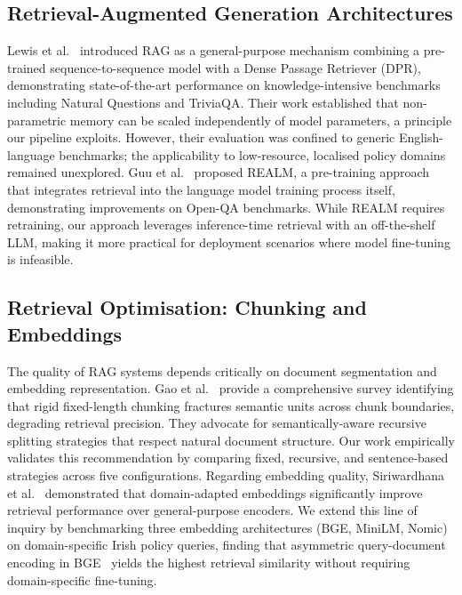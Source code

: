 \documentclass[conference]{IEEEtran}
\begin{document}
\subsection{Retrieval-Augmented Generation Architectures}

Lewis et al.~\cite{lewis2020retrieval} introduced RAG as a general-purpose mechanism combining a pre-trained sequence-to-sequence model with a Dense Passage Retriever (DPR), demonstrating state-of-the-art performance on knowledge-intensive benchmarks including Natural Questions and TriviaQA. Their work established that non-parametric memory can be scaled independently of model parameters, a principle our pipeline exploits. However, their evaluation was confined to generic English-language benchmarks; the applicability to low-resource, localised policy domains remained unexplored. Guu et al.~\cite{guu2020retrieval} proposed REALM, a pre-training approach that integrates retrieval into the language model training process itself, demonstrating improvements on Open-QA benchmarks. While REALM requires retraining, our approach leverages inference-time retrieval with an off-the-shelf LLM, making it more practical for deployment scenarios where model fine-tuning is infeasible.

\subsection{Retrieval Optimisation: Chunking and Embeddings}

The quality of RAG systems depends critically on document segmentation and embedding representation. Gao et al.~\cite{gao2023retrieval} provide a comprehensive survey identifying that rigid fixed-length chunking fractures semantic units across chunk boundaries, degrading retrieval precision. They advocate for semantically-aware recursive splitting strategies that respect natural document structure. Our work empirically validates this recommendation by comparing fixed, recursive, and sentence-based strategies across five configurations. Regarding embedding quality, Siriwardhana et al.~\cite{siriwardhana2023improving} demonstrated that domain-adapted embeddings significantly improve retrieval performance over general-purpose encoders. We extend this line of inquiry by benchmarking three embedding architectures (BGE, MiniLM, Nomic) on domain-specific Irish policy queries, finding that asymmetric query-document encoding in BGE~\cite{xiao2023bge} yields the highest retrieval similarity without requiring domain-specific fine-tuning.
\end{document}
